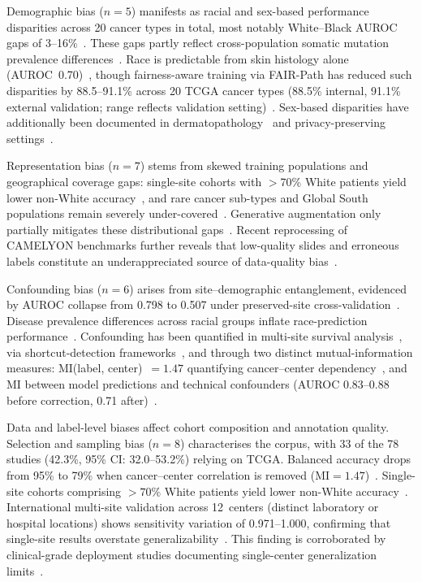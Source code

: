 Demographic bias ($n\!=\!5$) manifests as racial and sex-based performance disparities across 20 cancer types in total, most notably White--Black AUROC gaps of 3--16\%~\citep{vaidya2024demographic}. These gaps partly reflect cross-population somatic mutation prevalence differences~\citep{polin2025mutation}. Race is predictable from skin histology alone (AUROC~0.70)~\citep{chen2025predicting}, though fairness-aware training via FAIR-Path has reduced such disparities by 88.5--91.1\% across 20 TCGA cancer types (88.5\% internal, 91.1\% external validation; range reflects validation setting)~\citep{lin2025contrastive}. Sex-based disparities have additionally been documented in dermatopathology~\citep{lazarova2025demographic, daneshjou2022disparities} and privacy-preserving settings~\citep{arasteh2024preserving}.

Representation bias ($n\!=\!7$) stems from skewed training populations and geographical coverage gaps: single-site cohorts with $>$70\% White patients yield lower non-White accuracy~\citep{soltan2024challenges}, and rare cancer sub-types and Global South populations remain severely under-covered~\citep{tasci2022bias, musa2026cross, ceccon2025underrepresentation}. Generative augmentation only partially mitigates these distributional gaps~\citep{ktena2024generative, vanbooven2025mitigating}. Recent reprocessing of CAMELYON benchmarks further reveals that low-quality slides and erroneous labels constitute an underappreciated source of data-quality bias~\citep{ling2025benchmark}.

Confounding bias ($n\!=\!6$) arises from site--demographic entanglement, evidenced by AUROC collapse from 0.798 to 0.507 under preserved-site cross-validation~\citep{howard2021site}. Disease prevalence differences across racial groups inflate race-prediction performance~\citep{chen2025predicting}. Confounding has been quantified in multi-site survival analysis~\citep{dawood2026confounding}, via shortcut-detection frameworks~\citep{ly2024shortcut}, and through two distinct mutual-information measures: MI(label, center)~$=1.47$ quantifying cancer--center dependency~\citep{kheiri2025investigation}, and MI between model predictions and technical confounders (AUROC 0.83--0.88 before correction, 0.71 after)~\citep{lazard2022identifies}.

Data and label-level biases affect cohort composition and annotation quality. Selection and sampling bias ($n\!=\!8$) characterises the corpus, with 33 of the 78 studies (42.3\%, 95\% CI: 32.0--53.2\%) relying on TCGA. Balanced accuracy drops from 95\% to 79\% when cancer--center correlation is removed (MI$=1.47$)~\citep{kheiri2025investigation}. Single-site cohorts comprising ${>}70\%$ White patients yield lower non-White accuracy~\citep{soltan2024challenges, celi2022sources}. International multi-site validation across 12~centers (distinct laboratory or hospital locations) shows sensitivity variation of 0.971--1.000, confirming that single-site results overstate generalizability~\citep{tolkach2023international}. This finding is corroborated by clinical-grade deployment studies documenting single-center generalization limits~\citep{raza2026clinical, bussola2023weakly, ceccon2025underrepresentation}.

